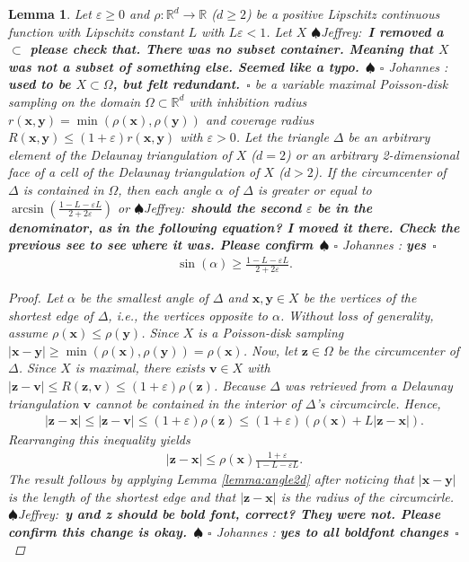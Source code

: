 \documentclass[preprint, 10pt]{elsarticle}
\newcommand{\vx}{{\mathbf x}}
\newcommand{\vy}{{\mathbf y}}
\newcommand{\vz}{{\mathbf z}}
\newcommand{\vv}{{\mathbf v}}
\newif\ifnotesw \noteswtrue
\newcommand{\jeffrey}[1]{\ifnotesw  \textcolor[rgb]{0,0,1}{  $\spadesuit$Jeffrey:\ {\sf \bf \it #1}\ $\spadesuit$ }\fi}
\newcommand{\johannes}[1]{\ifnotesw  \textcolor[rgb]{1,0,1}{ $\square$ Johannes : {\sf \bf \it #1}\ $\square$ }\fi}
\newtheorem{lemma}[theorem]{Lemma}
\theoremstyle{definition}
\theoremstyle{remark}
\begin{document}
\begin{lemma}\label{lemma:2}
	Let $\varepsilon\ge 0$ and $\rho:\mathbb{R}^d\rightarrow \mathbb{R}$ ($d\ge 2$) be a positive Lipschitz continuous function with Lipschitz constant $L$ with $L\varepsilon < 1$.
	Let $X$ \jeffrey{I removed a $\subset$ please check that. There was no subset container. 
    Meaning that $X$ was not a subset of something else. Seemed like a typo.}\johannes{used to be $X\subset \Omega$, but felt redundant.}  be a variable maximal Poisson-disk sampling on the domain $\Omega\subset \mathbb{R}^d$ with inhibition radius $r(\vx,\vy)=\min(\rho(\vx),\rho(\vy))$  and coverage radius $R(\vx,\vy) \le (1+\varepsilon)r(\vx,\vy)$ with $\varepsilon>0$.
	Let the triangle $\Delta$ be an arbitrary element of the Delaunay triangulation of $X$ ($d=2$) or an arbitrary 2-dimensional face of a cell of the Delaunay triangulation of $X$ ($d > 2$).
    If the circumcenter of $\Delta$ is contained in $\Omega$, then each angle $\alpha$ of $\Delta$ is greater or equal to $\arcsin\left(\frac{1-L-\varepsilon L}{2+2\varepsilon}\right)$ or \jeffrey{should the second $\varepsilon$ be in the denominator, as in the following equation? I moved it there.  Check the previous see to see where it was. Please confirm}\johannes{yes}
	 \begin{align*}		 
	 \sin(\alpha)\ge \frac{1-L-\varepsilon L}{2+2\varepsilon}.
	\end{align*}

\begin{proof}
Let $\alpha$ be the smallest angle of $\Delta$ and $\vx,\vy\in X$ be the vertices of the shortest edge of $\Delta$, i.e., the vertices opposite to $\alpha$. 
Without loss of generality, assume $\rho(\vx)\le \rho(\vy)$.
Since $X$ is a Poisson-disk sampling $|\vx-\vy|\ge \min\left(\rho(\vx),\rho(\vy)\right)=\rho(\vx)$. 
Now, let $\vz\in \Omega$ be the circumcenter of $\Delta$. 
Since $X$ is maximal, there exists $\vv\in X$ with $|\vz-\vv|\le R(\vz,\vv)\le (1+\varepsilon)\rho(\vz)$.  
Because $\Delta$ was retrieved from a Delaunay triangulation $\vv$ cannot be contained in the interior of $\Delta$'s circumcircle. 
Hence,
\begin{align*}
	|\vz-\vx|\le |\vz-\vv|\le (1+\varepsilon)\rho(\vz)\le (1+\varepsilon)\left(\rho(\vx)+L|\vz-\vx| \right).
\end{align*}
Rearranging this inequality yields 
\begin{align*}
    |\vz-\vx|\le \rho(\vx)\frac{1+\varepsilon}{1-L-\varepsilon L}.
\end{align*}
The result follows by applying Lemma \ref{lemma:angle2d} after noticing that $|\vx-\vy|$ is the length of the shortest edge and that $|\vz-\vx|$ is the radius of the circumcirle. \jeffrey{y and z should be bold font, correct? They were not. Please confirm this change is okay.}\johannes{yes to all boldfont changes}
	\end{proof}
\end{lemma}
\end{document}
